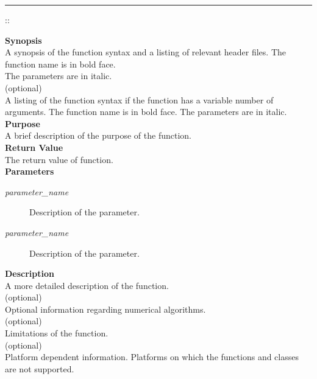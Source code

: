 \rhead{\CClass::\MemberFunction}
\noindent
\vspace{5pt}
\rule{6.5in}{.01in}
{\Large \CClass::\MemberFunction}\\
{}
 
\noindent
{\bf Synopsis}\\
A synopsis of the function syntax and a listing of relevant header files.
The function name is in bold face.\\
The parameters are in italic.\\
 
\noindent
[{\bf Syntax}] (optional)\\
A listing of the function syntax if the function has a variable number
of arguments.
The function name is in bold face.
The parameters are in italic.\\
 
\noindent
{\bf Purpose}\\
A brief description of the purpose of the function.\\
 
\noindent
{\bf Return Value}\\
The return value of function.\\
 
\noindent
{\bf Parameters}
\vspace*{-7.5pt}
\begin{description}
\item[{\it parameter\_name}] Description of the parameter.
\item[{\it parameter\_name}] Description of the parameter.
\end{description}
 
\noindent
{\bf Description}\\
A more detailed description of the function. \\
 
\noindent
[{\bf Algorithm}] (optional)\\
Optional information
regarding numerical algorithms. \\
 
\noindent
[{\bf Limitations}] (optional)\\
Limitations of the function.\\
 
\noindent
[{\bf Portability}] (optional)\\
Platform dependent information.
Platforms on which the functions and classes are not supported.\\
 

